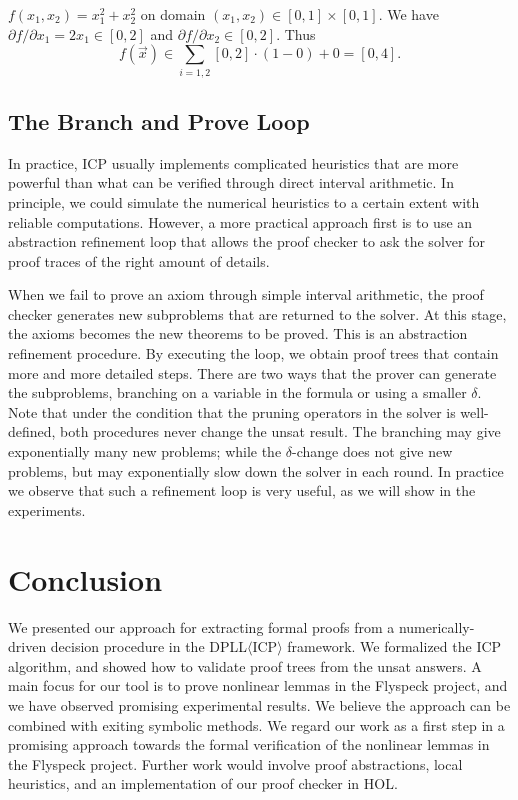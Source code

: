 \documentclass{llncs}
\begin{document}
\begin{example}
$f(x_1, x_2) = x_1^2 + x_2^2$ on domain $(x_1,x_2)\in [0,1]\times[0,1]$. We have $\partial f/\partial x_1 = 2x_1\in [0,2]$ and $\partial f/\partial x_2\in [0,2]$. Thus
$$f(\vec x)\in \sum_{i=1,2} [0,2]\cdot (1-0) + 0 = [0,4].$$
\end{example}


\subsection{The Branch and Prove Loop}

In practice, ICP usually implements complicated heuristics that are more
powerful than what can be verified through direct interval arithmetic. In
principle, we could simulate the numerical heuristics to a certain extent with
reliable computations. However, a more practical approach first is to use an
abstraction refinement loop that allows the proof checker to ask the
solver for proof traces of the right amount of details.

When we fail to prove an axiom through simple interval arithmetic, the proof
checker generates new subproblems that are returned to the solver. At this
stage, the axioms becomes the new theorems to be proved.
This is an abstraction refinement procedure. By executing the loop, we obtain
proof trees that contain more and more detailed steps. There are two ways that
the prover can generate the subproblems, branching on a variable in the
formula or using a smaller $\delta$. Note that under the condition that
the pruning operators in the solver is well-defined, both procedures never
change the {\sf unsat} result. The branching may give
exponentially many new problems; while the $\delta$-change does not give new
problems, but may exponentially slow down the solver in each round. In practice
we observe that such a refinement loop is very useful, as we will show in the
experiments.



\section{Conclusion}

We presented our approach for extracting formal proofs from a numerically-driven
decision procedure in the DPLL$\langle$ICP$\rangle$ framework. We formalized the ICP algorithm, and showed how to validate proof trees from the unsat answers.  A main focus for our tool is to prove
nonlinear lemmas in the Flyspeck project, and we have observed promising
experimental results. We believe the approach can be combined with exiting
symbolic methods. We regard our work as a first step in a promising approach towards the formal
verification of the nonlinear lemmas in the Flyspeck project. Further work
would involve proof abstractions, local heuristics, and an implementation of our proof checker in HOL.




% 
\end{document}
